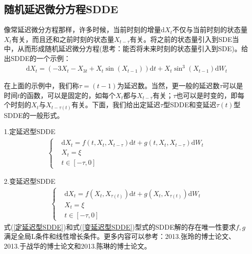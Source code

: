     \subsection{随机延迟微分方程SDDE}
        \par
        像常延迟微分方程那样，许多时候，当前时刻的增量$\mathrm{d}X_t$不仅与当前时刻的状态量$X_t$有关，而且还和之前时刻的状态量$X_{t-\tau}$有关。将之前的状态量引入到SDE当中，从而形成随机延迟微分方程(思考：能否将未来时刻的状态量引入到SDE)。给出SDDE的一个示例：
        \begin{align*}
            \mathrm{d}X_t = (-3X_t - X_{3t}+ X_t\sin(X_{t-1}))\mathrm{d}t + X_t \sin ^3(X_{t-1})\mathrm{d}W_t
        \end{align*}
        \par
        在上面的示例中，我们称$\tau = (t-1)$为延迟数。当然，更一般的延迟数$\tau$可以是时间$t$的函数，可以是固定的，如每个$X_t$都与$X_{t-\tau}$有关；$\tau$也可以是时变的，即每个时刻的$X_t$与$X_{t- \tau(t)}$有关。下面，我们给出定延迟$\tau$型SDDE和变延迟$\tau(t)$型SDDE的一般形式。
        \par
        1.定延迟型SDDE
        \begin{align}
            \label{定延迟型SDDE}
            \left\{
                \begin{aligned}
                &\mathrm{d}X_t = f(t,X_t,X_{t-\tau})\mathrm{d}t + g(t,X_t,X_{t-\tau})\mathrm{d}W_t\\
                &X_t =\xi\\
                &t \in [-\tau,0]
                \end{aligned}
            \right.
        \end{align}
        \par
        2.变延迟型SDDE
        \begin{align}
            \label{变延迟型SDDE}
            \left\{
                \begin{aligned}
                &\mathrm{d}X_t = f(X_t,X_{\tau(t)})\mathrm{d}t + g(X_t,X_{\tau(t)})\mathrm{d}W_t\\
                &X_t =\xi\\
                &t \in [-\tau,0]
                \end{aligned}
            \right.
        \end{align}
        式(\ref{定延迟型SDDE})和式(\ref{变延迟型SDDE})型式的SDDE解的存在唯一性要求$f,g$满足全局L条件和线性增长条件。更多内容可以参考：2013.张玲的博士论文\cite{Zhang.2013}、2013.于战华的博士论文\cite{Yu.2013}和2013.陈琳的博士论文\cite{Chen.2013}。
